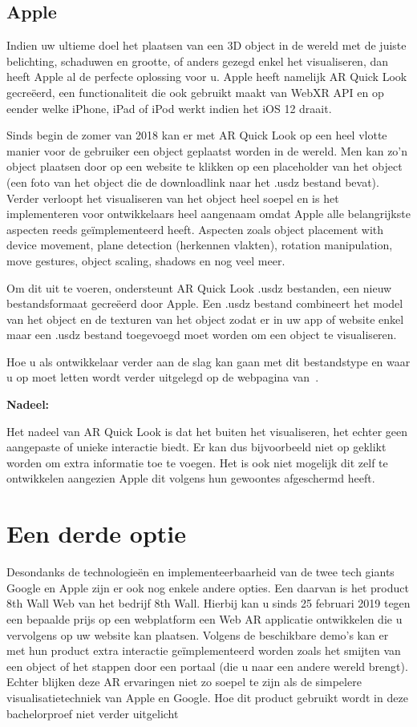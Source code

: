 \subsection{Apple}

Indien uw ultieme doel het plaatsen van een 3D object in de wereld met de juiste belichting, schaduwen en grootte, of anders gezegd enkel het visualiseren, dan heeft Apple al de perfecte oplossing voor u. Apple heeft namelijk AR Quick Look gecreëerd, een functionaliteit die ook gebruikt maakt van WebXR API en op eender welke iPhone, iPad of iPod werkt indien het iOS 12 draait. 

Sinds begin de zomer van 2018 kan er met AR Quick Look op een heel vlotte manier voor de gebruiker een object geplaatst worden in de wereld. Men kan zo'n object plaatsen door op een website te klikken op een placeholder van het object (een foto van het object die de downloadlink naar het .usdz bestand bevat). Verder verloopt het visualiseren van het object heel soepel en is het implementeren voor ontwikkelaars heel aangenaam omdat Apple alle belangrijkste aspecten reeds geïmplementeerd heeft. Aspecten zoals object placement with device movement, plane detection (herkennen vlakten), rotation manipulation, move gestures, object scaling, shadows en nog veel meer. 

Om dit uit te voeren, ondersteunt AR Quick Look .usdz bestanden, een nieuw bestandsformaat gecreëerd door Apple. Een .usdz bestand combineert het model van het object en de texturen van het object zodat er in uw app of website enkel maar een .usdz bestand toegevoegd moet worden om een object te visualiseren. 

Hoe u als ontwikkelaar verder aan de slag kan gaan met dit bestandstype en waar u op moet letten wordt verder uitgelegd op de webpagina van~\textcite{Apple2018}.

\textbf{Nadeel:}

Het nadeel van AR Quick Look is dat het buiten het visualiseren, het echter geen aangepaste of unieke interactie biedt. Er kan dus bijvoorbeeld niet op geklikt worden om extra informatie toe te voegen. Het is ook niet mogelijk dit zelf te ontwikkelen aangezien Apple dit volgens hun gewoontes afgeschermd heeft. 

\section{Een derde optie}
\label{sec:een-derde-optie}

Desondanks de technologieën en implementeerbaarheid van de twee tech giants Google en Apple zijn er ook nog enkele andere opties. Een daarvan is het product 8th Wall Web van het bedrijf 8th Wall. Hierbij kan u sinds 25 februari 2019 tegen een bepaalde prijs op een webplatform een Web AR applicatie ontwikkelen die u vervolgens op uw website kan plaatsen. Volgens de beschikbare demo's kan er met hun product extra interactie geïmplementeerd worden zoals het smijten van een object of het stappen door een portaal (die u naar een andere wereld brengt). Echter blijken deze AR ervaringen niet zo soepel te zijn als de simpelere visualisatietechniek van Apple en Google. Hoe dit product gebruikt wordt in deze bachelorproef niet verder uitgelicht 


